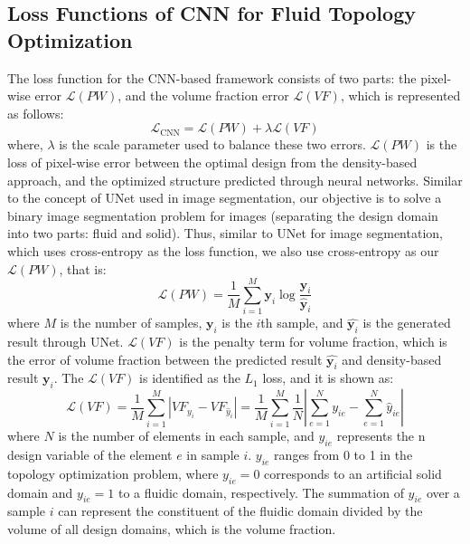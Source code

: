 \documentclass{article}
\begin{document}
\subsection{Loss Functions of CNN for Fluid Topology Optimization}
The loss function for the CNN-based framework consists of two parts: the pixel-wise error $\mathcal{L}(PW)$, and the volume fraction error $\mathcal{L}(VF)$, which is represented as follows:
\begin{equation}\label{Loss_CNN}
\mathcal{L}_{\text{CNN}} = \mathcal{L}(PW) + \lambda \mathcal{L}(VF)
\end{equation}
where,  $\lambda$ is the scale parameter used to balance these two errors. $\mathcal{L}(PW)$ is the loss of pixel-wise error between the optimal design from the density-based approach, and the optimized structure predicted through neural networks. Similar to the concept of UNet used in image segmentation, our objective is to solve a binary image segmentation problem for images (separating the design domain into two parts: fluid and solid). Thus, similar to UNet for image segmentation, which uses cross-entropy as the loss function, we also use cross-entropy as our $\mathcal{L}(PW)$, that is:
\begin{equation}\label{Loss_org_CNN}
\mathcal{L}(PW)  =\frac{1}{M} \sum_{i = 1}^ {M} \mathbf{y}_i \log \frac{\mathbf{y}_i}{\hat{\mathbf{y}}_i}
\end{equation}
where $M$ is the number of samples, $\mathbf{y}_i$ is the $i$th sample, and $\hat{\mathbf{y}_i}$ is the generated result through UNet. $\mathcal{L}(VF)$ is the penalty term for volume fraction, which is the error of volume fraction between the predicted result $\hat{\mathbf{y}_i}$ and density-based result $\mathbf{y}_i$. The $\mathcal{L}{(VF)}$ is identified as the $L_1$ loss, and it is shown as: 
\begin{equation}\label{VF_representation}
    \mathcal{L}{(VF)} = \frac{1}{M}\sum_{i = 1}^{M} \left|VF_{y_i} - VF_{\hat{y}_i}\right| =\frac{1}{M}\sum_{i = 1}^{M} \frac{1}{N} \left|\sum_{e = 1}^N y_{ie} - \sum_{e = 1}^N\hat{y}_{ie} \right|
\end{equation}
where $N$ is the number of elements in each sample, and  $y_{ie}$ represents the n design variable of the element $e$ in sample $i$.  $y_{ie}$ ranges from 0 to 1 in the topology optimization problem, where $y_{ie} = 0$ corresponds to an artificial solid domain and $y_{ie} = 1$ to a fluidic domain, respectively. The summation of $y_{ie}$ over a sample $i$ can represent the constituent of the fluidic domain divided by the volume of all design domains, which is the volume fraction.
\end{document}
